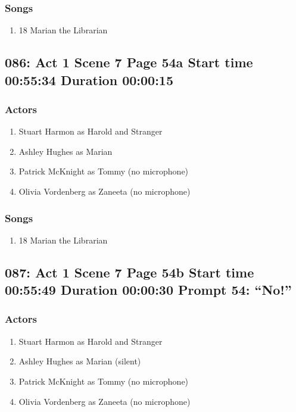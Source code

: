 \subsubsection{Songs}
\begin{enumerate}
\item 18 Marian the Librarian
\end{enumerate}
\subsection{086: Act 1 Scene 7 Page 54a Start time 00:55:34 Duration 00:00:15}

\subsubsection{Actors}
\begin{enumerate}
\item Stuart Harmon as Harold and Stranger
\item Ashley Hughes as Marian
\item Patrick McKnight as Tommy (no microphone)
\item Olivia Vordenberg as Zaneeta (no microphone)
\end{enumerate}

\subsubsection{Songs}
\begin{enumerate}
\item 18 Marian the Librarian
\end{enumerate}
\subsection{087: Act 1 Scene 7 Page 54b Start time 00:55:49 Duration 00:00:30 Prompt 54: ``No!''}

\subsubsection{Actors}
\begin{enumerate}
\item Stuart Harmon as Harold and Stranger
\item Ashley Hughes as Marian (silent)
\item Patrick McKnight as Tommy (no microphone)
\item Olivia Vordenberg as Zaneeta (no microphone)
\end{enumerate}

